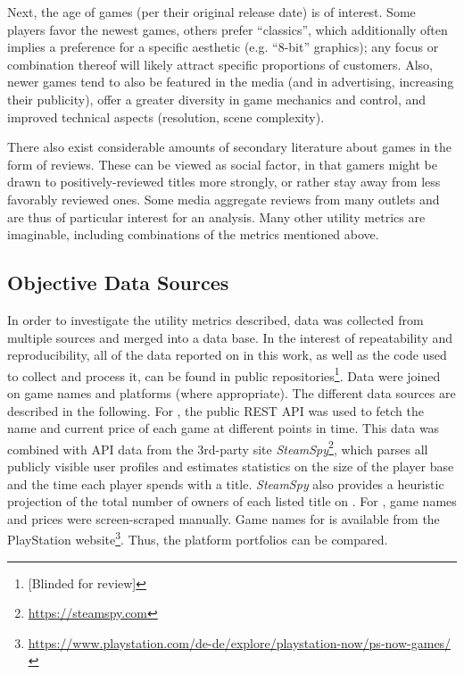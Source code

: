 Next, the age of games (per their original release date) is of
interest. Some players favor the newest games, others prefer ``classics'', 
which additionally often implies a preference for a specific aesthetic (e.g.
``8-bit'' graphics); any focus or combination thereof will likely attract
specific proportions of customers. Also, newer games tend to also be featured
in the media (and in advertising, increasing their publicity),
offer a greater diversity in game mechanics and control,
and improved technical aspects (resolution, scene complexity).

There also exist considerable amounts of secondary literature about
games in the form of reviews. These can be viewed as social factor,
in that gamers might be drawn to positively-reviewed titles more
strongly, or rather stay away from less favorably reviewed ones.
Some media aggregate reviews from many outlets and
are thus of particular interest for an analysis. Many other utility
metrics are imaginable, including combinations of the metrics mentioned above.

\subsection{Objective Data Sources}
In order to investigate the utility metrics described, data was collected from
multiple sources and merged
into a data base. In the interest of repeatability and
reproducibility, all of the data reported on in this work, as well as
the code used to collect and process it, can be found in public
repositories\footnote{[Blinded for review]}.
Data were joined on game names and platforms (where appropriate).
The different data sources are described in the following.
For \steam, the public \acrshort{REST} \acrshort{API} was used to
fetch the name and current price of each game at different points in
time.
This data was combined with \acrshort{API} data from the 3rd-party site
\textit{SteamSpy}\footnote{\url{https://steamspy.com}}, which parses all
publicly visible \steam user profiles and
estimates statistics on the size of the player base and the time each
player spends with a title. \textit{SteamSpy} also provides a heuristic
projection of the total number of owners of each listed title on \steam.
For \gfnow, game names and prices were screen-scraped manually.
Game names for \psnow is available from the PlayStation
website\footnote{\url{https://www.playstation.com/de-de/explore/playstation-now/ps-now-games/}}.
Thus, the platform portfolios can be compared.


